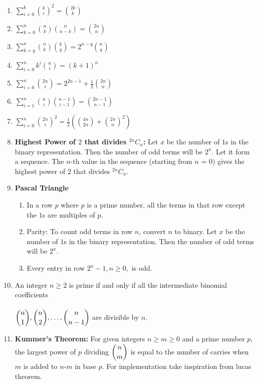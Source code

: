 \begin{enumerate}
    \item $\displaystyle \sum \limits_{i=0}^k{k \choose i}^2={2k \choose k}$
    \item $\displaystyle \sum \limits_{k=0}^n{n \choose k}{n \choose n-k}={2n \choose n}$
    \item $\displaystyle \sum \limits_{k=q}^n{n \choose k}{k \choose q}=2^{n-q}{n \choose q}$
    \item $\displaystyle \sum \limits_{i=0}^nk^i{n \choose i}=(k+1)^n$
    \item $\displaystyle \sum \limits_{i=0}^n{2n \choose i}=2^{2n-1}+\frac{1}{2}{2n \choose n}$
    \item $\displaystyle \sum \limits_{i=1}^n{n \choose i}{n-1 \choose i-1}={2n-1 \choose n-1}$
    \item $\displaystyle \sum \limits_{i=0}^n{2n \choose i}^2=\frac{1}{2} \left( {4n \choose 2n}+{2n \choose n}^2 \right)$
    \item \textbf{Highest Power of $\displaystyle 2$ that divides $^{2n}C_n$:}
          Let $\displaystyle x$ be the number of $\displaystyle 1$s in the binary representation. Then the number of odd terms will be $\displaystyle 2^x$. Let it form a sequence. The $n$-th value in the sequence (starting from $n$ = 0) gives the highest power of $\displaystyle 2$ that divides $^{2n}C_n$.
    \item \textbf{Pascal Triangle}
          \begin{enumerate}
              \item In a row $\displaystyle p$ where $\displaystyle p$ is a prime number, all the terms in that row except the $\displaystyle 1$s are multiples of $\displaystyle p$.
              \item Parity: To count odd terms in row $n$, convert $n$ to binary. Let $\displaystyle x$ be the number of $\displaystyle 1$s in the binary representation. Then the number of odd terms will be $\displaystyle 2^x$.
              \item Every entry in row $\displaystyle 2^n-1, n\geq 0,$ is odd.
          \end{enumerate}
    \item An integer $n\geq 2$ is prime if and only if all the intermediate binomial coefficients \\ \\  $\displaystyle \displaystyle {n \choose 1},{n \choose 2},\dots, {n \choose n-1}$ are divisible by $n$.
    \item \textbf{Kummer’s Theorem:} For given integers $n\geq m\geq 0$ and a prime number $\displaystyle p$, the largest power of $\displaystyle p$ dividing $\displaystyle \displaystyle {n \choose m}$ is equal to the number of carries when $m$ is added to $n$-$m$ in base $\displaystyle p$. For implementation take inspiration from lucas theorem.

\end{enumerate}
